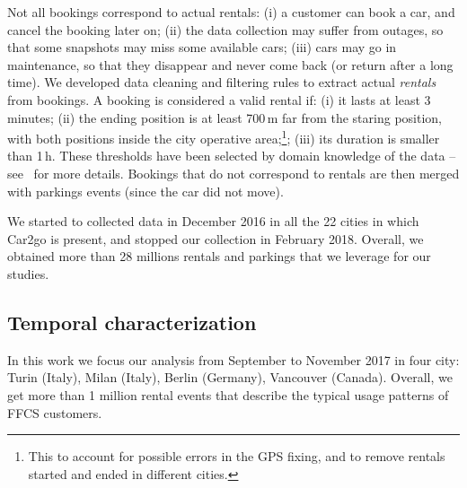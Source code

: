 Not all bookings correspond to actual rentals:
(i) a customer can book a car, and cancel the booking later on;
(ii) the data collection may suffer from outages, so that some snapshots may miss some available cars;
(iii) cars may go in maintenance, so that they disappear and never come back (or return after a long time).
We developed data cleaning and filtering rules to extract actual \textit{rentals} from bookings. A booking is considered a valid rental if:
(i) it lasts at least 3 minutes;
(ii) the ending position is at least 700\,m far from the staring position, with both positions inside the city operative area;\footnote{This to account for possible errors in the GPS fixing, and to remove rentals started and ended in different cities.};
(iii) its duration is smaller than 1\,h. These thresholds have been selected by domain knowledge of the data -- see~\cite{UMAP} for more details.
Bookings that do not correspond to rentals are then merged with parkings events (since the car did not move).

We started to collected data in December 2016 in all the 22 cities in which Car2go is present, and stopped our collection in February 2018. Overall, we obtained more than 28 millions rentals and parkings that we leverage for our studies.

\subsection{Temporal characterization}
In this work we focus our analysis from September to November 2017 in four city: Turin (Italy), Milan (Italy), Berlin (Germany), Vancouver (Canada). %
Overall, we get more than 1 million rental events that describe the typical usage patterns of FFCS customers. 



